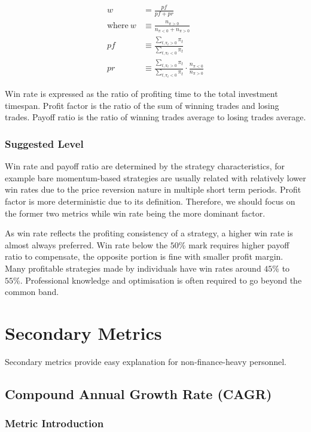 \documentclass[12pt]{article}
\begin{document}
\begin{align*}
  w &= \frac{pf}{pf+pr} \\
  \text{where}~w &\equiv \frac{n_{\pi>0}}{n_{\pi<0} + n_{\pi>0}} \\
  pf &\equiv \frac{\sum_{t, \pi_t>0} \pi_t}{\sum_{t, \pi_t<0} \pi_t} \\
  pr &\equiv \frac{\sum_{t, \pi_t>0} \pi_t}{\sum_{t, \pi_t<0} \pi_t} \cdot \frac{n_{\pi<0}}{n_{\pi>0}}
\end{align*}

Win rate is expressed as the ratio of profiting time to the total investment timespan. Profit factor is the ratio of the sum of winning trades and losing trades. Payoff ratio is the ratio of winning trades average to losing trades average.

\subsubsection*{Suggested Level}

Win rate and payoff ratio are determined by the strategy characteristics, for example bare momentum-based strategies are usually related with relatively lower win rates due to the price reversion nature in multiple short term periods. Profit factor is more deterministic due to its definition. Therefore, we should focus on the former two metrics while win rate being the more dominant factor.

As win rate reflects the profiting consistency of a strategy, a higher win rate is almost always preferred. Win rate below the $50\%$ mark requires higher payoff ratio to compensate, the opposite portion is fine with smaller profit margin. Many profitable strategies made by individuals have win rates around $45\%$ to $55\%$. Professional knowledge and optimisation is often required to go beyond the common band.

\section{Secondary Metrics}

Secondary metrics provide easy explanation for non-finance-heavy personnel.

\subsection{Compound Annual Growth Rate (CAGR)}

\subsubsection*{Metric Introduction}
\end{document}
